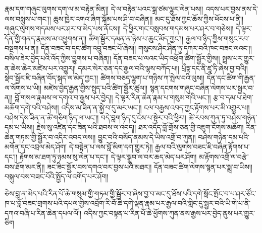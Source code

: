 \documentclass{article}
\begin{document}
རྣམ་དག་གཞུང་ལུགས་དག་ལ་མ་བརྟེན་མིན།།
དེ་ལ་བརྟེན་པའང་སྒྲ་ཙམ་ལྷུར་ལེན་པས།།
འདས་པར་བྱས་ནས་དེ་ལས་བསླུས་པ་གང༌།།
ཆུས་ཁྱེར་འགའ་ཞིག་སྐོམ་པས་ཤི་བ་བཞིན།།
མང་དུ་ཐོས་ཀྱང་ཆོས་ཀྱིས་ཕོངས་པ་ནི།།
གཞུང་ལུགས་གདམས་པར་ཤར་བ་མེད་པས་ནོངས།།
དེ་ཕྱིར་གང་བསླབས་གདམས་པར་ཤར་བ་གཅེས།།
དེ་ལྟར་དོན་གྱི་གནད་རྣམས་མ་འཕྱུགས་ན།།
ཚིག་སྦྱོར་དམན་ན་ཉེས་པ་ཆུང་མོད་ཀྱང༌།།
རྒྱལ་བ་ཉིད་ཀྱིས་གསུང་རབ་བསྔགས་པ་ན།།
དོན་བཟང་བ་དང་ཚིག་འབྲུ་བཟང་པོ་ཞེས།།
གསུངས་ཤིང་ཤིན་ཏུ་དཀར་བའི་ཁང་བཟང་ལའང༌།།
བསིལ་ཟེར་བྱེད་པའི་འོད་ཀྱིས་བྱུགས་པ་བཞིན།།
དོན་བཟང་པ་ལའང་ཡིད་འཕྲོག་ཚིག་སྦྱོར་གྱིས།།
སྤྲས་པར་གྱུར་ན་ཆེས་ཆེར་མཛེས་པར་འགྱུར།།
དམར་སེར་ཅན་དང་རྒྱལ་བའི་ལྷས་བཀོད་པ།།
པྲྀཏྟ་དང་ནི་ཛཱ་ཏི་ཞེས་བྱ་བའི།།
སྡེབ་སྦྱོར་ཇི་བཞིན་བོད་སྐད་ལ་མེད་ཀྱང༌།།
ཚིགས་བཅད་ལྷུག་པ་གཉིས་ཀ་སྤེལ་བའི་ལུས།།
དོན་དང་ཚིག་གི་རྒྱན་ལ་སོགས་པ་ཡི།།
མཛེས་བྱེད་རྒྱན་གྱིས་སྤུད་པའི་ཚིག་སྦྱོར་ཚུལ།།
སྙན་དངགས་གཞུང་བཞིན་ལེགས་པར་སྦྱར་བ་ན།།
བློ་གསལ་རྣམས་ལ་དགའ་བ་རྒྱས་པར་བྱེད།།
དེ་ལྟར་རིན་ཆེན་རྣམ་པ་གསུམ་གའི་ཡང༌།།
རྩ་བ་དམ་པ་ཐེག་མཆོག་དགེ་བའི་བཤེས།།
འདིས་མ་ཟིན་ན་སྐྱེ་བ་དུ་མར་ཡང༌།།
ངལ་བརྒྱས་འབད་ཀྱང་རྟོགས་པར་མི་འགྱུར་པ།།
བཤེས་དེས་ཟིན་ན་ཚེ་གཅིག་ཉིད་ལ་ཡང༌།།
བདེ་བླག་ཉིད་དུ་ངེས་པ་སྟེར་བའི་ཕྱིར།།
ཚེ་རབས་ཀུན་ཏུ་བཤེས་གཉེན་དམ་པ་ཡིས།།
རྗེས་སུ་འཛིན་དང་ཟིན་པའི་ཐབས་ལ་འབད།།
ཐར་འདོད་བློ་གྲོས་ཅན་གྱི་འཇུག་ངོགས་མཆོག།
རིན་ཆེན་གཏམ་གྱི་སྦྱོར་བ་འདིར་འབད་ལས།།
བྱུང་བའི་བསོད་ནམས་དེ་ཡིས་འགྲོ་བ་ཀུན།།
བཤེས་གཉེན་དམ་པའི་མགོན་དང་འབྲལ་མེད་ཤོག།
དེ་བསྟེན་པ་ལས་བློ་མིག་དག་གྱུར་ཏེ།།
རྒྱལ་བའི་ལུགས་བཟང་ཇི་བཞིན་རྟོགས་པ་དང༌།།
རྟོགས་མ་ཐག་ཏུ་ཉམས་སུ་ལེན་པ་དང༌།།
དེ་ལྟར་སྒྲུབ་ལ་བར་ཆད་མེད་པར་ཤོག།
མ་རྟོགས་འགྲོ་ལ་བརྩེ་བས་ཐོག་མར་ནི།།
ཟང་ཟིང་སྦྱོར་བས་དགའ་བར་བྱས་པའི་མཐར།།
དོན་བཟང་ཚིག་ལེགས་སྙན་པར་སྨྲ་བ་ཡིས།།
བསྐུལ་བས་བཟང་པོའི་སྤྱོད་ལ་འགོད་པར་ཤོག།

{\small ཅེས་བླ་ན་མེད་པའི་རིན་པོ་ཆེ་གསུམ་གྱི་གཏམ་གྱི་སྦྱོར་བ་ཞེས་བྱ་བ་མང་དུ་ཐོས་པའི་དགེ་སློང་སྤོང་བ་པ་ཤར་ཙོང་ཁ་པ་བློ་བཟང་གྲགས་པའི་དཔལ་གྱིས་འབྲོག་རི་བོ་ཆེ་དགེ་ལྡན་རྣམ་པར་རྒྱལ་བའི་གླིང་དུ་སྦྱར་བའི་ཡི་གེ་པ་ནི་དཀའ་བཞི་པ་རིན་ཆེན་དཔལ་ལོ།།
འདིས་ཀྱང་བསྟན་པ་རིན་པོ་ཆེ་ཕྱོགས་ཀུན་ནས་རྒྱས་པར་བྱེད་ནུས་པར་གྱུར་ཅིག}
\end{document}
